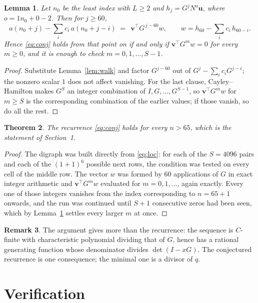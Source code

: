 \documentclass[11pt,a4paper]{article}
\theoremstyle{plain}
\newtheorem{theorem}{Theorem}
\newtheorem{lemma}[theorem]{Lemma}
\theoremstyle{definition}
\newtheorem{remark}[theorem]{Remark}
\begin{document}
\begin{lemma}\label{lem:crit}
Let $n_0$ be the least index with $L\ge2$ and $h_j=G^{j}N^{o}\mathbf{u}$, where
$o=1n_0+0-2$. Then for $j\ge60$,
\[
a(n_0+j)-\sum_i c_i\,a(n_0+j-i)\;=\;\,\mathbf{v}^{\!\top}G^{\,j-60}w,
\qquad w=h_{60}-\sum_i c_i\,h_{60-i} .
\]
Hence \eqref{eq:conj} holds from that point on if and only if
$\mathbf{v}^{\!\top}G^{m}w=0$ for every $m\ge0$, and it is enough to check
$m=0,1,\dots,S-1$.
\end{lemma}

\begin{proof}
Substitute Lemma~\ref{lem:walk} and factor $G^{j-60}$ out of
$G^{j}-\sum_ic_iG^{j-i}$; the nonzero scalar $1$ does not affect
vanishing. For the last clause, Cayley--Hamilton makes $G^{S}$ an integer combination of
$I,G,\dots,G^{S-1}$, so $\mathbf{v}^{\!\top}G^{m}w$ for $m\ge S$ is the corresponding
combination of the earlier values; if those vanish, so do all the rest.
\end{proof}

\begin{theorem}
The recurrence \eqref{eq:conj} holds for every $n>65$, which is the statement of
Section~1.
\end{theorem}

\begin{proof}
The digraph was built directly from \eqref{eq:loc}: for each of the $S=4096$ pairs and each
of the $(1+1)^{6}$ possible next rows, the condition was tested on every cell of
the middle row. The vector $w$ was formed by $60$ applications of $G$ in exact integer
arithmetic and $\mathbf{v}^{\!\top}G^{m}w$ evaluated for $m=0,1,\dots$, again exactly.
Every one of those integers vanishes from the index corresponding to $n=65+1$ onwards,
and the run was continued until $S+1$ consecutive zeros had been seen, which by
Lemma~\ref{lem:crit} settles every larger $m$ at once.
\end{proof}

\begin{remark}
The argument gives more than the recurrence: the sequence is $C$-finite with characteristic
polynomial dividing that of $G$, hence has a rational generating function whose denominator
divides $\det(I-xG)$. The conjectured recurrence is one consequence; the minimal one is a
divisor of $q$.
\end{remark}

\section{Verification}
\end{document}
